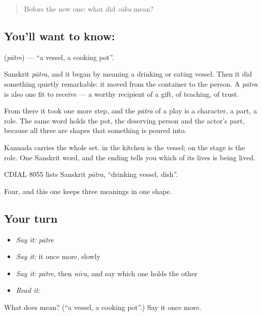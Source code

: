 \label{lesson:KA-C56-vessel}



\begin{quote}
Before the new one: what did \emph{cāku} mean?
\end{quote}

\subsection*{You'll want to know: }
\textbf{} (\emph{pātre}) — \textquotedblleft{}a vessel, a cooking pot\textquotedblright{}.

Sanskrit \emph{pātra}, and it began by meaning a drinking or eating vessel. Then it did something quietly remarkable: it moved from the container to the person. A \emph{pātra} is also one fit to receive — a worthy recipient of a gift, of teaching, of trust.

From there it took one more step, and the \emph{pātra} of a play is a character, a part, a role. The same word holds the pot, the deserving person and the actor's part, because all three are shapes that something is poured into.

Kannada carries the whole set.  in the kitchen is the vessel;  on the stage is the role. One Sanskrit word, and the ending tells you which of its lives is being lived.

CDIAL 8055 lists Sanskrit \emph{pātra}, \textquotedblleft{}drinking vessel, dish\textquotedblright{}.

\begin{grammarlens}[title={What you've built}]
Four, and this one keeps three meanings in one shape.
\end{grammarlens}

\subsection*{Your turn}
\begin{itemize}
\raggedright
  \item \emph{Say it:} \emph{pātre}
  \item \emph{Say it:} it once more, slowly
  \item \emph{Say it:} \emph{pātre}, then \emph{nīru}, and say which one holds the other
  \item \emph{Read it:} \textbf{}
\end{itemize}

\begin{tcolorbox}[breakable,colback=teal!4,colframe=teal!35!black,title={Before you move on}]
What does  mean? (\textquotedblleft{}a vessel, a cooking pot\textquotedblright{}.) Say it once more.
\end{tcolorbox}
